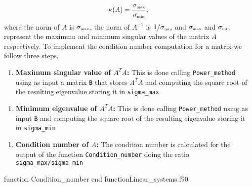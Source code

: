      \begin{equation*}
     \kappa(A)= \frac{\sigma_{\mbox{\tiny max}}}{\sigma_{\mbox{\tiny min}}},
     \end{equation*}
where the norm of $ A $ is $\sigma_{\mbox{\tiny max}}$, the norm of 
$A^{-1}$ is $ 1/\sigma_{\mbox{\tiny min}} $  and $\sigma_{\mbox{\tiny 
max}}$  and $  \sigma_{\mbox{\tiny min}} $ represent the maximum and minimum  
singular values of the matrix $A$ respectively. 
To implement the condition number computation for a matrix we follow three 
steps.
     \begin{enumerate}
     	\item \textbf{Maximum singular value of $A^TA$:} This is done calling 
     	\verb|Power_method| using as input a matrix \texttt{B} that stores 
     	$A^TA$ and computing the square root of the resulting eigenvalue 
     	storing it in \verb|sigma_max|
     \end{enumerate}
 
     \begin{enumerate}[resume]
     	\item \textbf{Minimum eigenvalue of $A^TA$:} This is done calling 
     	\verb|Power_method| using as input \texttt{B} and computing the square 
     	root of the resulting eigenvalue storing it in \verb|sigma_min|
     \end{enumerate}
      
     
     \begin{enumerate}[resume]
     	\item \textbf{Condition number of $A$:} The condition number is 
     	calculated for the output of the function \verb|Condition_number| doing 
     	the ratio \verb|sigma_max/sigma_min| 
     \end{enumerate}
     
     \vspace{0.5cm} 
     {function Condition_number}
     {end function}{Linear_systems.f90}
     
 

